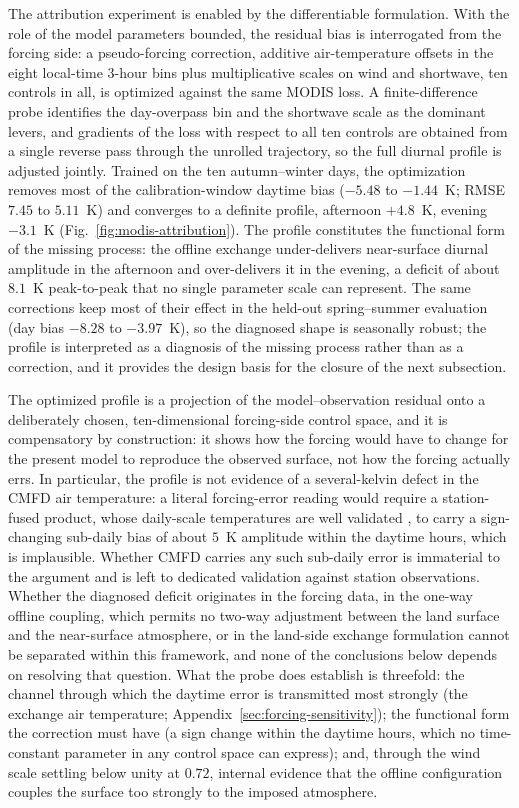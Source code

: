The attribution experiment is enabled by the differentiable formulation.
With the role of the model parameters bounded, the residual bias
is interrogated from the forcing side: a pseudo-forcing correction,
additive air-temperature offsets in the eight local-time 3-hour bins plus
multiplicative scales on wind and shortwave, ten controls in all, is
optimized against the same MODIS loss. A finite-difference probe identifies
the day-overpass bin and the shortwave scale as the dominant levers, and
gradients of the loss with respect to all ten controls are obtained from a
single reverse pass through the unrolled trajectory, so the full diurnal
profile is adjusted jointly. Trained on the ten autumn--winter days, the
optimization removes most of the calibration-window daytime bias ($-5.48$ to
$-1.44$~K; RMSE $7.45$ to $5.11$~K) and converges to a definite profile,
afternoon $+4.8$~K, evening $-3.1$~K
(Fig.~\ref{fig:modis-attribution}). The profile constitutes the functional
form of the missing process: the offline exchange under-delivers
near-surface diurnal amplitude in the afternoon and over-delivers it in the
evening, a deficit of about $8.1$~K peak-to-peak that no single parameter
scale can represent. The same corrections keep most of their effect in the
held-out spring--summer evaluation (day bias $-8.28$ to $-3.97$~K), so the
diagnosed shape is seasonally robust; the profile is interpreted as a
diagnosis of the missing process rather than as a correction, and it
provides the design
basis for the closure of the next subsection.

The optimized profile is a projection of the model--observation
residual onto a deliberately chosen, ten-dimensional forcing-side control
space, and it is compensatory by construction: it shows how the forcing
would have to change for the present model to reproduce the observed
surface, not how the forcing actually errs. In particular, the profile is
not evidence of a several-kelvin defect in the CMFD air temperature: a
literal forcing-error reading would require a station-fused product, whose
daily-scale temperatures are well validated \citep{He2020CMFD}, to carry a
sign-changing sub-daily bias of about $5$~K amplitude within the daytime
hours, which is implausible. Whether CMFD carries any such sub-daily error
is immaterial to the argument and is left to dedicated validation against
station observations. Whether the diagnosed deficit originates in the
forcing data, in the one-way offline coupling, which permits no two-way
adjustment between the land surface and the near-surface atmosphere, or in
the land-side exchange formulation cannot be separated within this
framework, and none of the conclusions below depends on resolving that
question. What the probe does establish is threefold: the channel through
which the daytime error is transmitted most strongly (the exchange air
temperature; Appendix~\ref{sec:forcing-sensitivity}); the functional form
the correction must have (a sign change within the daytime hours, which no
time-constant parameter in any control space can express); and, through
the wind scale settling below unity at $0.72$, internal evidence that the
offline configuration couples the surface too strongly to the imposed
atmosphere.

